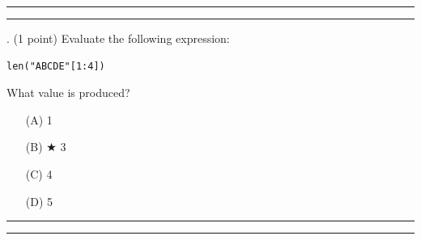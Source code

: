 \documentclass{article}
\begin{document}
\vspace*{2em}
\hrule
\vspace{2em}

\vspace{2em}
\hrule height 2pt


\newpage
{}. (1 point)
Evaluate the following expression:
\begin{verbatim}
len("ABCDE"[1:4])
\end{verbatim}
What value is produced?


\begin{enumerate}
\item[(A)]
1

\item[(B)] $\bigstar$ 
3

\item[(C)]
4

\item[(D)]
5

\end{enumerate}

\vspace*{2em}
\hrule
\vspace{2em}

\vspace{2em}
\hrule height 2pt
\end{document}
